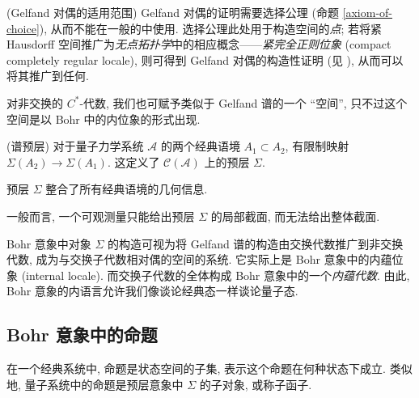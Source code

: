 \begin{remark}
	{(Gelfand 对偶的适用范围)}
	Gelfand 对偶的证明需要选择公理 (命题 \ref{axiom-of-choice}), 从而不能在一般的\topos{}中使用. 选择公理此处用于构造空间的\emph{点}; 若将紧 Hausdorff 空间推广为\emph{无点拓扑学}中的相应概念------\emph{紧完全正则位象} (compact completely regular locale), 则可得到 Gelfand 对偶的构造性证明 (见 \cite{CGDC}), 从而可以将其推广到任何\topos{}.
\end{remark}

对非交换的 $C^*$-代数, 我们也可赋予类似于 Gelfand 谱的一个 ``空间'', 只不过这个空间是以 Bohr \topos{}中的内位象的形式出现.

\begin{definition}
    {(谱预层)}
    对于量子力学系统 $\mathcal A$ 的两个经典语境 $A_1 \subset A_2$, 有限制映射 $\Sigma(A_2)\to\Sigma(A_1)$. 这定义了 $\mathcal C(\mathcal A)$ 上的预层 $\Sigma$.
\end{definition}

\begin{remark}
    {}
    预层 $\Sigma$ 整合了所有经典语境的几何信息.
    
    一般而言, 一个可观测量只能给出预层 $\Sigma$ 的局部截面, 而无法给出整体截面.
\end{remark}

Bohr 意象中对象 $\Sigma$ 的构造可视为将 Gelfand 谱的构造由交换代数推广到非交换代数, 成为与交换子代数相对偶的空间的系统. 它实际上是 Bohr 意象中的内蕴位象 (internal locale). 而交换子代数的全体构成 Bohr 意象中的一个\emph{内蕴代数}. 由此, Bohr 意象的内语言允许我们像谈论经典态一样谈论量子态.

\subsection{Bohr 意象中的命题}



在一个经典系统中, 命题是状态空间的子集, 表示这个命题在何种状态下成立.
类似地, 量子系统中的命题是预层意象中 $\Sigma$ 的子对象, 或称子函子.